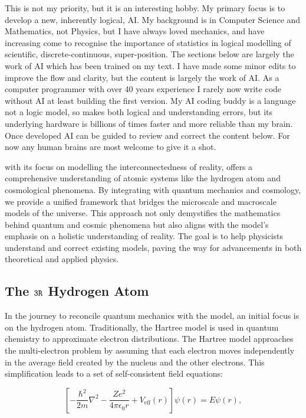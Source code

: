 \documentclass[12pt]{article}
\begin{document}
This is not my priority, but it is an interesting hobby. My primary focus is to develop a new, inherently logical, \iR{} AI. My background is in Computer Science and Mathematics, not Physics, but I have always loved mechanics, and have increasing come to recognise the importance of statistics in logical modelling of scientific, discrete-continuous, super-position. The sections below are largely the work of AI which has been trained on my \iR{} text. I have made some minor edits to improve the flow and clarity, but the content is largely the work of AI. As a computer programmer with over 40 years experience I rarely now write code without AI at least building the first version. My AI coding buddy is a language not a logic model, so makes both logical and understanding errors, but its underlying hardware is billions of times faster and more reliable than my brain. Once developed \iR{} AI can be guided to review and correct the content below. For now any human brains are most welcome to give it a shot.

\iR{} with its focus on modelling the interconnectedness of reality, offers a comprehensive understanding of atomic systems like the hydrogen atom and cosmological phenomena. By integrating \iR{} with quantum mechanics and cosmology, we provide a unified framework that bridges the microscale and macroscale models of the universe. This approach not only demystifies the mathematics behind quantum and cosmic phenomena but also aligns with the \iR{} model's emphasis on a holistic understanding of reality. The goal is to help physicists understand and correct existing models, paving the way for advancements in both theoretical and applied physics.

\subsection*{The \(\texttt{3R}\) Hydrogen Atom}

In the journey to reconcile quantum mechanics with the \iR{} model, an initial focus is on the hydrogen atom. Traditionally, the Hartree model is used in quantum chemistry to approximate electron distributions. The Hartree model approaches the multi-electron problem by assuming that each electron moves independently in the average field created by the nucleus and the other electrons. This simplification leads to a set of self-consistent field equations:

\[
    \left[ -\frac{\hbar^2}{2m}\nabla^2 - \frac{Ze^2}{4\pi\epsilon_0 r} + V_{\text{eff}}(r) \right] \psi(r) = E\psi(r),
\]
\end{document}

